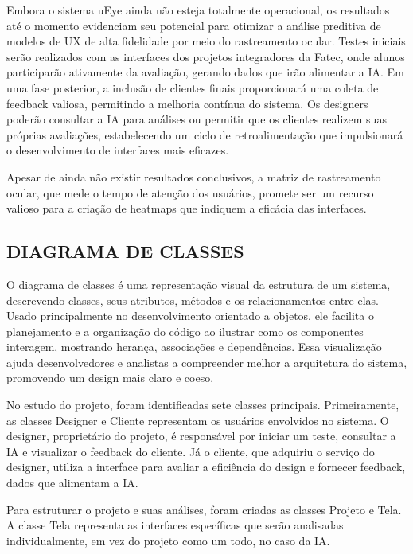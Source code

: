 Embora o sistema uEye ainda não esteja totalmente operacional, os resultados até o momento evidenciam seu potencial para otimizar a análise preditiva de modelos de UX de alta fidelidade por meio do rastreamento ocular. Testes iniciais serão realizados com as interfaces dos projetos integradores da Fatec, onde alunos participarão ativamente da avaliação, gerando dados que irão alimentar a IA. Em uma fase posterior, a inclusão de clientes finais proporcionará uma coleta de feedback valiosa, permitindo a melhoria contínua do sistema. Os designers poderão consultar a IA para análises ou permitir que os clientes realizem suas próprias avaliações, estabelecendo um ciclo de retroalimentação que impulsionará o desenvolvimento de interfaces mais eficazes.

Apesar de ainda não existir resultados conclusivos, a matriz de rastreamento ocular, que mede o tempo de atenção dos usuários, promete ser um recurso valioso para a criação de heatmaps que indiquem a eficácia das interfaces.\newline

\subsection*{DIAGRAMA DE CLASSES}
O diagrama de classes é uma representação visual da estrutura de um sistema, descrevendo classes, seus atributos, métodos e os relacionamentos entre elas. Usado principalmente no desenvolvimento orientado a objetos, ele facilita o planejamento e a organização do código ao ilustrar como os componentes interagem, mostrando herança, associações e dependências. Essa visualização ajuda desenvolvedores e analistas a compreender melhor a arquitetura do sistema, promovendo um design mais claro e coeso. \textcite{Lucidchart}

No estudo do projeto, foram identificadas sete classes principais. Primeiramente, as classes Designer e Cliente representam os usuários envolvidos no sistema. O designer, proprietário do projeto, é responsável por iniciar um teste, consultar a IA e visualizar o feedback do cliente. Já o cliente, que adquiriu o serviço do designer, utiliza a interface para avaliar a eficiência do design e fornecer feedback, dados que alimentam a IA.

Para estruturar o projeto e suas análises, foram criadas as classes Projeto e Tela. A classe Tela representa as interfaces específicas que serão analisadas individualmente, em vez do projeto como um todo, no caso da IA.

